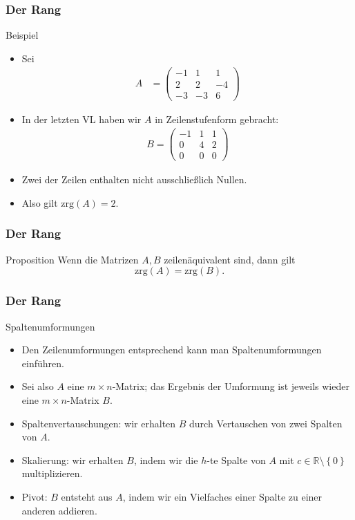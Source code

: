 \documentclass{beamer}
\newcommand\RR{\mathbb R}
\newcommand\cbc[1]{\left\{{#1}\right\}}
\renewcommand{\ae}{\"a}
\newcommand{\ue}{\"u}
\newcommand{\rrk}{\mathrm{zrg}}
\newcommand{\mytitle}{Der Rang}
\begin{document}
\begin{frame}\frametitle{\mytitle}
	\begin{block}{Beispiel}
		\begin{itemize}
			\item Sei
				\begin{align*}
					A&=\begin{pmatrix}
						-1&1&1\\2&2&-4\\-3&-3&6
					\end{pmatrix}
					\end{align*}
				\item In der letzten VL haben wir $A$ in Zeilenstufenform gebracht:
					\begin{align*}
						B=\begin{pmatrix} -1&1&1\\0&4&2\\0&0&0 \end{pmatrix}
					\end{align*}
			\item Zwei der Zeilen enthalten nicht ausschlie\ss lich Nullen.
			\item Also gilt $\rrk(A)=2$.
			\end{itemize}
		\end{block}
\end{frame}

\begin{frame}\frametitle{\mytitle}
	\begin{block}{Proposition}
		Wenn die Matrizen $A,B$ zeilen\ae quivalent sind, dann gilt $$\rrk(A)=\rrk(B).$$	
	\end{block}
\end{frame}

\begin{frame}\frametitle{\mytitle}
	\begin{block}{Spaltenumformungen}
		\begin{itemize}
			\item Den Zeilenumformungen entsprechend kann man Spaltenumformungen einf\ue hren.
			\item Sei also $A$ eine $m\times n$-Matrix; das Ergebnis der Umformung ist jeweils wieder eine $m\times n$-Matrix $B$.
			\item \alert{Spaltenvertauschungen:} wir erhalten $B$ durch Vertauschen von zwei Spalten von $A$.
			\item \alert{Skalierung:} wir erhalten $B$, indem wir die $h$-te Spalte von $A$ mit $c\in\RR\setminus\cbc 0$ multiplizieren.
			\item \alert{Pivot:} $B$ entsteht aus $A$, indem wir ein Vielfaches einer Spalte zu einer anderen addieren.
		\end{itemize}
	\end{block}
\end{frame}
\end{document}
